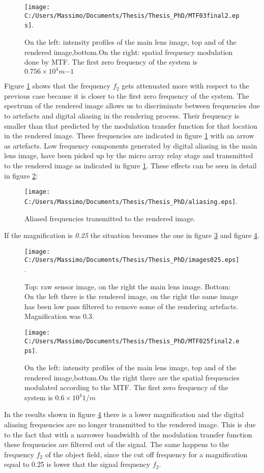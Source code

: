  \begin{figure}[H]
 	\centering
 	\texttt{[image: C:/Users/Massimo/Documents/Thesis/Thesis\_PhD/MTF03final2.eps]}.
 	\caption{\label{fig:freq03} On the left: intensity profiles of the main lens image, top and of the rendered image,bottom.On the right: spatial frequency modulation done by MTF. The first zero frequency of the system is $0.756 \times 10^4 m{-1}$}
 \end{figure}
 Figure \ref{fig:freq03} shows that the frequency $f_2$ gets attenuated more with respect to the previous case because it is closer to the first zero frequency of the system. The spectrum of the rendered image allows us to discriminate between frequencies due to artefacts and digital aliasing in the rendering process. Their frequency is smaller than that predicted by the modulation transfer function for that location in the rendered image. These frequencies are indicated in figure \ref{fig:freq03} with an arrow as artefacts. Low frequency components generated by digital aliasing in the main lens image, have been picked up by the micro array relay stage and transmitted to the rendered image as indicated in figure \ref{fig:freq03}. These effects can be seen in detail in figure \ref{fig:aliasing}:
 \begin{figure}[H]
 	\centering
 	\texttt{[image: C:/Users/Massimo/Documents/Thesis/Thesis\_PhD/aliasing.eps]}.
 	\caption{\label{fig:aliasing} Aliased frequencies transmitted to the rendered image. }
 \end{figure}
If the magnification is \textit{0.25} the situation becomes the one in figure \ref{fig:image025} and figure \ref{fig:freq025}.
 \begin{figure}[H]
 	\centering
 	\texttt{[image: C:/Users/Massimo/Documents/Thesis/Thesis\_PhD/images025.eps]}.
 	\caption{\label{fig:image025} Top: raw sensor image, on the right the main lens image. Bottom: On the left there is the  rendered image, on the right the same image has been low pass filtered to remove some of the rendering artefacts. Magnification was 0.3.  }
 \end{figure}
 \begin{figure}[H]
 	\centering
 	\texttt{[image: C:/Users/Massimo/Documents/Thesis/Thesis\_PhD/MTF025final2.eps]}.
 	\caption{\label{fig:freq025} On the left: intensity profiles of the main lens image, top and of the rendered image,bottom.On the right there are the spatial frequencies modulated according to the MTF. The first zero frequency of the system is $0.6 \times 10^4 1/m$} 
 \end{figure}
 In the results shown in figure \ref{fig:freq025} there is a lower magnification and the digital aliasing frequencies are no longer transmitted to the rendered image. This is due to the fact that with a narrower  bandwidth of the modulation transfer function these frequencies are filtered out of the signal. The same happens to the frequency $f_2$ of the object field, since the cut off frequency for a magnification equal to 0.25 is lower that the signal frequency $f_2$.
